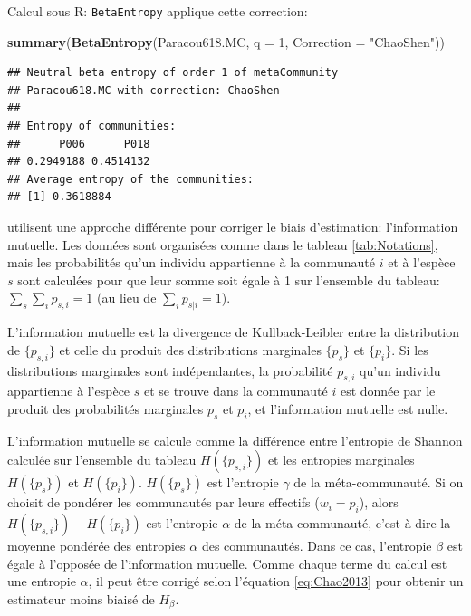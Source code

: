 \documentclass[
  11pt,
  french,
  a4paper,
  extrafontsizes,onecolumn,openright
  ]{memoir}
\newenvironment{Shaded}{\begin{snugshade}}{\end{snugshade}}
\newcommand{\AttributeTok}[1]{\textcolor[rgb]{0.13,0.29,0.53}{#1}}
\newcommand{\DecValTok}[1]{\textcolor[rgb]{0.00,0.00,0.81}{#1}}
\newcommand{\FunctionTok}[1]{\textcolor[rgb]{0.13,0.29,0.53}{\textbf{#1}}}
\newcommand{\NormalTok}[1]{#1}
\newcommand{\StringTok}[1]{\textcolor[rgb]{0.31,0.60,0.02}{#1}}
\begin{document}
Calcul sous R: \texttt{BetaEntropy} applique cette correction:

\scriptsize

\begin{Shaded}
\begin{Highlighting}[]
\FunctionTok{summary}\NormalTok{(}\FunctionTok{BetaEntropy}\NormalTok{(Paracou618.MC, }\AttributeTok{q =} \DecValTok{1}\NormalTok{, }\AttributeTok{Correction =} \StringTok{"ChaoShen"}\NormalTok{))}
\end{Highlighting}
\end{Shaded}

\begin{verbatim}
## Neutral beta entropy of order 1 of metaCommunity 
## Paracou618.MC with correction: ChaoShen 
## 
## Entropy of communities: 
##      P006      P018 
## 0.2949188 0.4514132 
## Average entropy of the communities: 
## [1] 0.3618884
\end{verbatim}

\normalsize

\textcite{Chao2013} utilisent une approche différente pour corriger le biais d'estimation: l'information mutuelle.
Les données sont organisées comme dans le tableau \ref{tab:Notations}, mais les probabilités qu'un individu appartienne à la communauté \(i\) et à l'espèce \(s\) sont calculées pour que leur somme soit égale à 1 sur l'ensemble du tableau: \(\sum_s{\sum_i{p_{s,i}}}=1\) (au lieu de \(\sum_i{p_{s|i}}=1\)).

L'information mutuelle est la divergence de Kullback-Leibler entre la distribution de \(\{p_{s,i}\}\) et celle du produit des distributions marginales \(\{p_s\}\) et \(\{p_i\}\).
Si les distributions marginales sont indépendantes, la probabilité \(p_{s,i}\) qu'un individu appartienne à l'espèce \(s\) et se trouve dans la communauté \(i\) est donnée par le produit des probabilités marginales \(p_s\) et \(p_i\), et l'information mutuelle est nulle.

L'information mutuelle se calcule comme la différence entre l'entropie de Shannon calculée sur l'ensemble du tableau \(H(\{p_{s,i}\})\) et les entropies marginales \(H(\{p_s\})\) et \(H(\{p_i\})\).
\(H(\{p_s\})\) est l'entropie \(\gamma\) de la méta-communauté.
Si on choisit de pondérer les communautés par leurs effectifs (\(w_i=p_i\)), alors \(H(\{p_{s,i}\})-H(\{p_i\})\) est l'entropie \(\alpha\) de la méta-communauté, c'est-à-dire la moyenne pondérée des entropies \(\alpha\) des communautés.
Dans ce cas, l'entropie \(\beta\) est égale à l'opposée de l'information mutuelle.
Comme chaque terme du calcul est une entropie \(\alpha\), il peut être corrigé selon l'équation \eqref{eq:Chao2013} pour obtenir un estimateur moins biaisé de \(H_{\beta}\).
\end{document}
